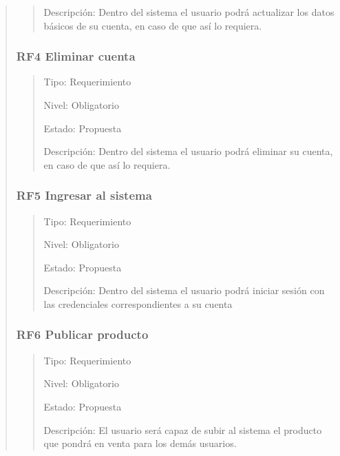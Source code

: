 \documentclass[14pt]{article}
\begin{document}
\begin{quote}
\begin{quote}
                        Descripción: Dentro del sistema el usuario podrá actualizar los datos básicos de su cuenta, en caso de que así lo requiera.
                    \end{quote}
                \subsubsection{RF4 Eliminar cuenta}\label{RF4 Eliminar cuenta}
                    \begin{quote}
                    Tipo: Requerimiento
                    
                    Nivel: Obligatorio
                    
                    Estado: Propuesta
                    
                    Descripción: Dentro del sistema el usuario podrá eliminar su cuenta, en caso de que así lo requiera.
                    \end{quote}
                \subsubsection{RF5 Ingresar al sistema}\label{RF5 Ingresar al sistema}
                    \begin{quote}
                        Tipo: Requerimiento
                        
                        Nivel: Obligatorio
                        
                        Estado: Propuesta
                        
                        Descripción: Dentro del sistema el usuario podrá iniciar sesión con las credenciales correspondientes a su cuenta
                    \end{quote}
                \subsubsection{RF6 Publicar producto}\label{RF6 Publicar producto}
                    \begin{quote}
                        Tipo: Requerimiento
                        
                        Nivel: Obligatorio
                        
                        Estado: Propuesta
                        
                        Descripción: El usuario será capaz de subir al sistema el producto que pondrá en venta para los demás usuarios.
                    \end{quote}

\end{quote}
\end{document}
